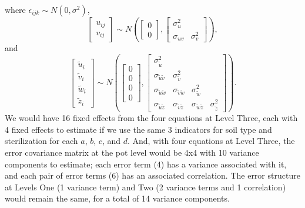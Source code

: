 \documentclass[
]{krantz}
\begin{document}
where \(\epsilon_{ijk}\sim N(0,\sigma^2)\),
\[ \left[ \begin{array}{c}
            u_{ij} \\ v_{ij}
          \end{array}  \right] \sim N \left( \left[
          \begin{array}{c}
            0 \\ 0
          \end{array} \right], \left[
          \begin{array}{cc}
            \sigma_{u}^{2} & \\
            \sigma_{uv} & \sigma_{v}^{2}
          \end{array} \right] \right), \] and
\[ \left[ \begin{array}{c}
            \tilde{u}_{i} \\ \tilde{v}_{i} \\ \tilde{w}_{i} \\ \tilde{z}_{i}
          \end{array}  \right] \sim N \left( \left[
          \begin{array}{c}
            0 \\ 0 \\ 0 \\ 0
          \end{array} \right], \left[
          \begin{array}{cccc}
            \sigma_{\tilde{u}}^{2} & & & \\
            \sigma_{\tilde{u}\tilde{v}} & \sigma_{\tilde{v}}^{2} & & \\
            \sigma_{\tilde{u}\tilde{w}} & \sigma_{\tilde{v}\tilde{w}} & \sigma_{\tilde{w}}^{2} & \\
            \sigma_{\tilde{u}\tilde{z}} & \sigma_{\tilde{v}\tilde{z}} & \sigma_{\tilde{w}\tilde{z}} & \sigma_{\tilde{z}}^{2}
          \end{array} \right] \right). \]
We would have 16 fixed effects from the four equations at Level Three, each with 4 fixed effects to estimate if we use the same 3 indicators for soil type and sterilization for each \(a\), \(b\), \(c\), and \(d\). And, with four equations at Level Three, the error covariance matrix at the pot level would be 4x4 with 10 variance components to estimate; each error term (4) has a variance associated with it, and each pair of error terms (6) has an associated correlation. The error structure at Levels One (1 variance term) and Two (2 variance terms and 1 correlation) would remain the same, for a total of 14 variance components.
\end{document}
